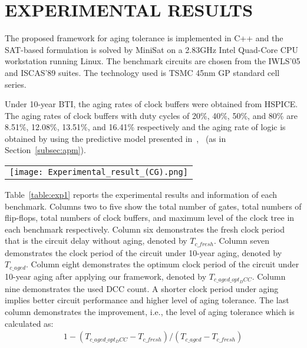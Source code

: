 \section{EXPERIMENTAL RESULTS}
\label{sec:exp}
The proposed framework for aging tolerance is implemented in C++ and the SAT-based formulation is solved by MiniSat on a 2.83GHz Intel Quad-Core CPU workstation running Linux. The benchmark circuits are chosen from the IWLS'05 and ISCAS'89 suites. The technology used is TSMC 45nm GP standard cell series.

Under 10-year BTI, the aging rates of clock buffers were obtained from HSPICE. The aging rates of clock buffers with duty cycles of 20\%, 40\%, 50\%, and 80\% are 8.51\%, 12.08\%, 13.51\%, and 16.41\% respectively and the aging rate of logic is obtained by using the predictive model presented in~\cite{wang2010impact},~\cite{wang2007efficient} (as in Section~\ref{subsec:apm}).

\begin{table*}
\centering
\caption{Results of aging tolerance}
	\begin{tabular}{l}
	\texttt{[image: Experimental\_result\_(CG).png]}
	\end{tabular}
\label{table:exp1}
\end{table*}

Table~\ref{table:exp1} reports the experimental results and information of each benchmark. Columns two to five show the total number of gates, total numbers of flip-flops, total numbers of clock buffers, and maximum level of the clock tree in each benchmark respectively. Column six demonstrates the fresh clock period that is the circuit delay without aging, denoted by $T_{c\_fresh}$. Column seven demonstrates the clock period of the circuit under 10-year aging, denoted by $T_{c\_aged}$. Column eight demonstrates the optimum clock period of the circuit under 10-year aging after applying our framework, denoted by $T_{c\_aged\_opt_DCC}$. Column nine demonstrates the used DCC count. A shorter clock period under aging implies better circuit performance and higher level of aging tolerance. The last column demonstrates the improvement, i.e., the level of aging tolerance which is calculated as:
\begin{gather*}
1 - (T_{c\_aged\_opt_DCC} - T_{c\_fresh}) / (T_{c\_aged} - T_{c\_fresh})
\end{gather*}


